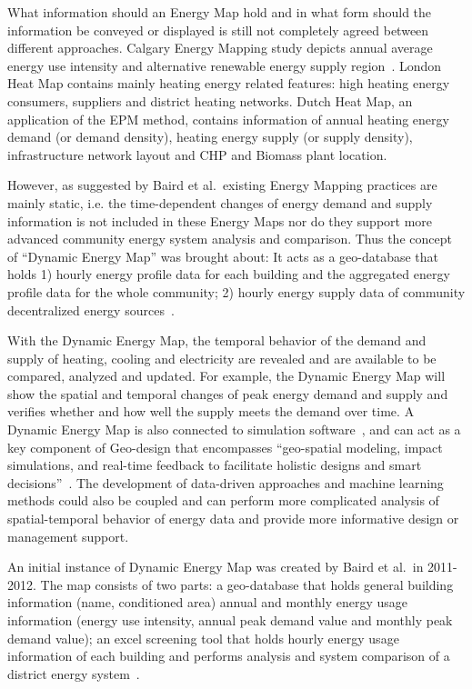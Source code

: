 What information should an Energy Map hold and in what form should the
information be conveyed or displayed is still not completely agreed
between different approaches. Calgary Energy Mapping study depicts
annual average energy use intensity and alternative renewable energy
supply region~\cite{aacip2009}. London Heat Map contains mainly
heating energy related features: high heating energy consumers,
suppliers and district heating networks. Dutch Heat Map, an
application of the EPM method, contains information of annual heating
energy demand (or demand density), heating energy supply (or supply
density), infrastructure network layout and CHP and Biomass plant
location.

However, as suggested by Baird et al.\ existing Energy Mapping
practices are mainly static, i.e. the time-dependent changes of energy
demand and supply information is not included in these Energy Maps nor
do they support more advanced community energy system analysis and
comparison. Thus the concept of ``Dynamic Energy Map'' was brought
about: It acts as a geo-database that holds 1) hourly energy profile
data for each building and the aggregated energy profile data for the
whole community; 2) hourly energy supply data of community
decentralized energy sources~\cite{baird2014}. 

With the Dynamic Energy Map, the temporal behavior of the demand and
supply of heating, cooling and electricity are revealed and are
available to be compared, analyzed and updated. For example, the
Dynamic Energy Map will show the spatial and temporal changes of peak
energy demand and supply and verifies whether and how well the supply
meets the demand over time. A Dynamic Energy Map is also connected to
simulation software~\cite{baird2014}, and can act as a key component
of Geo-design that encompasses ``geo-spatial modeling, impact
simulations, and real-time feedback to facilitate holistic designs and
smart decisions''~\cite{esriGeodesign2012}. The development of
data-driven approaches and machine learning methods could also be
coupled and can perform more complicated analysis of spatial-temporal
behavior of energy data and provide more informative design or
management support.

An initial instance of Dynamic Energy Map was created by Baird et al.\
in 2011-2012. The map consists of two parts: a geo-database that holds
general building information (name, conditioned area) annual and
monthly energy usage information (energy use intensity, annual peak
demand value and monthly peak demand value); an excel screening tool
that holds hourly energy usage information of each building and
performs analysis and system comparison of a district energy
system~\cite{baird2014}.

